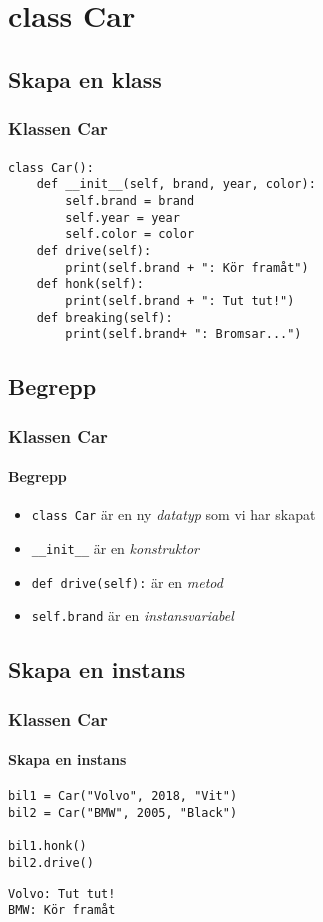 \documentclass[aspectratio=169]{beamer}
\begin{document}
\section{class Car}

\subsection{Skapa en klass}

\begin{frame}[fragile]
	\frametitle{Klassen Car}
	\framesubtitle{}
	
	\begin{lstlisting}
class Car():
    def __init__(self, brand, year, color):
        self.brand = brand
        self.year = year
        self.color = color
    def drive(self):
        print(self.brand + ": Kör framåt")
    def honk(self):
        print(self.brand + ": Tut tut!")
    def breaking(self):
        print(self.brand+ ": Bromsar...")
	\end{lstlisting}
	
\end{frame}

\subsection{Begrepp}

\begin{frame}
	\frametitle{Klassen Car}
	\framesubtitle{Begrepp}
	
	\begin{itemize}
		\item \texttt{class Car} är en ny \textit{datatyp} som vi har skapat
		\item \texttt{\_\_init\_\_} är en \textit{konstruktor}
		\item \texttt{def drive(self):} är en \textit{metod}
		\item \texttt{self.brand} är en \textit{instansvariabel}
	\end{itemize}
\end{frame}

\subsection{Skapa en instans}

\begin{frame}[fragile]
	\frametitle{Klassen Car}
	\framesubtitle{Skapa en instans}
	
	\begin{lstlisting}
bil1 = Car("Volvo", 2018, "Vit")
bil2 = Car("BMW", 2005, "Black")

bil1.honk()
bil2.drive()
	\end{lstlisting}
	
	\begin{verbatim}
Volvo: Tut tut!
BMW: Kör framåt
	\end{verbatim}

\end{frame}
\end{document}
